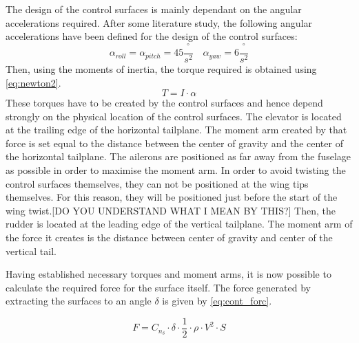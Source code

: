 The design of the control surfaces is mainly dependant on the angular accelerations required. After some literature study, the following angular accelerations have been defined for the design of the control surfaces: 
\begin{equation*}
    \alpha_{roll} = \alpha_{pitch} = 45 \frac{^\circ}{s^2} \quad \alpha_{yaw} = 6 \frac{^\circ}{s^2}
\end{equation*}
Then, using the moments of inertia, the torque required is obtained using \autoref{eq:newton2}.
\begin{equation}
    T = I \cdot \alpha
    \label{eq:newton2}
\end{equation}
These torques have to be created by the control surfaces and hence depend strongly on the physical location of the control surfaces. The elevator is located at the trailing edge of the horizontal tailplane. The moment arm created by that force is set equal to the distance between the center of gravity and the center of the horizontal tailplane. The ailerons are positioned as far away from the fuselage as possible in order to maximise the moment arm. In order to avoid twisting the control surfaces themselves, they can not be positioned at the wing tips themselves. For this reason, they will be positioned just before the start of the wing twist.[DO YOU UNDERSTAND WHAT I MEAN BY THIS?] Then, the rudder is located at the leading edge of the vertical tailplane. The moment arm of the force it creates is the distance between center of gravity and center of the vertical tail. 

Having established necessary torques and moment arms, it is now possible to calculate the required force for the surface itself. The force generated by extracting the surfaces to an angle $\delta$ is given by \autoref{eq:cont_forc}.

\begin{equation}
    F = C_{n_{\delta}}\cdot \delta\cdot\frac{1}{2}\cdot\rho\cdot V^2 \cdot S
    \label{eq:cont_forc}
\end{equation}

